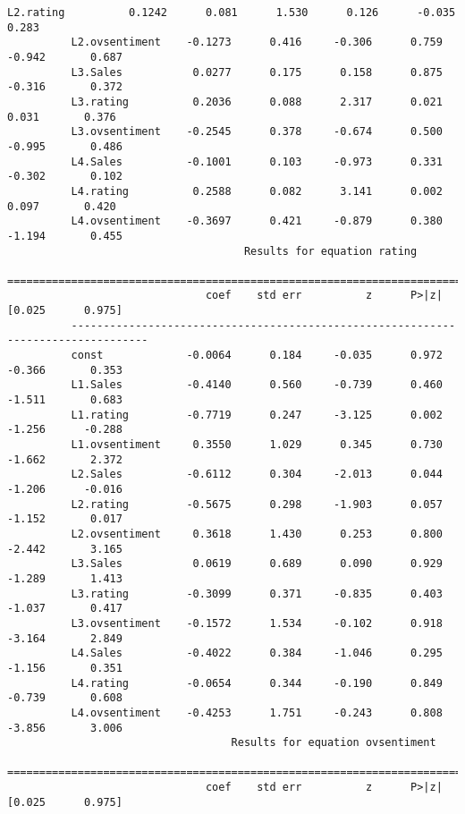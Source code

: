 \documentclass[11pt]{article}
\begin{document}
\begin{Verbatim}[commandchars=\\\{\}]
          L2.rating          0.1242      0.081      1.530      0.126      -0.035       0.283
          L2.ovsentiment    -0.1273      0.416     -0.306      0.759      -0.942       0.687
          L3.Sales           0.0277      0.175      0.158      0.875      -0.316       0.372
          L3.rating          0.2036      0.088      2.317      0.021       0.031       0.376
          L3.ovsentiment    -0.2545      0.378     -0.674      0.500      -0.995       0.486
          L4.Sales          -0.1001      0.103     -0.973      0.331      -0.302       0.102
          L4.rating          0.2588      0.082      3.141      0.002       0.097       0.420
          L4.ovsentiment    -0.3697      0.421     -0.879      0.380      -1.194       0.455
                                     Results for equation rating                            
          ==================================================================================
                               coef    std err          z      P>|z|      [0.025      0.975]
          ----------------------------------------------------------------------------------
          const             -0.0064      0.184     -0.035      0.972      -0.366       0.353
          L1.Sales          -0.4140      0.560     -0.739      0.460      -1.511       0.683
          L1.rating         -0.7719      0.247     -3.125      0.002      -1.256      -0.288
          L1.ovsentiment     0.3550      1.029      0.345      0.730      -1.662       2.372
          L2.Sales          -0.6112      0.304     -2.013      0.044      -1.206      -0.016
          L2.rating         -0.5675      0.298     -1.903      0.057      -1.152       0.017
          L2.ovsentiment     0.3618      1.430      0.253      0.800      -2.442       3.165
          L3.Sales           0.0619      0.689      0.090      0.929      -1.289       1.413
          L3.rating         -0.3099      0.371     -0.835      0.403      -1.037       0.417
          L3.ovsentiment    -0.1572      1.534     -0.102      0.918      -3.164       2.849
          L4.Sales          -0.4022      0.384     -1.046      0.295      -1.156       0.351
          L4.rating         -0.0654      0.344     -0.190      0.849      -0.739       0.608
          L4.ovsentiment    -0.4253      1.751     -0.243      0.808      -3.856       3.006
                                   Results for equation ovsentiment                         
          ==================================================================================
                               coef    std err          z      P>|z|      [0.025      0.975]

\end{Verbatim}
\end{document}

